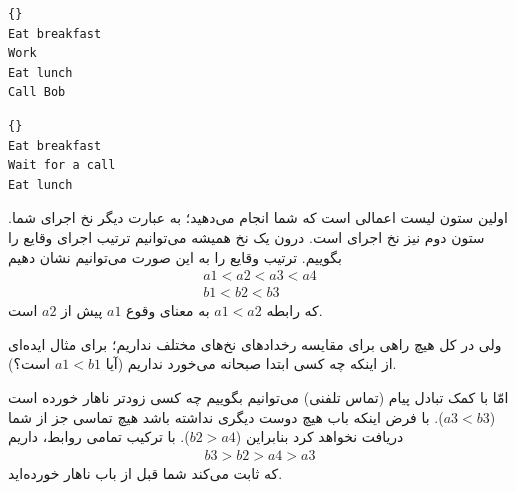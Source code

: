 \documentclass{book}
\begin{document}
%
\begin{latin}
\begin{minipage}[t]{2in}
\begin{latin}
\begin{lstlisting}[title=\rl{نخ \lr{A} (شما)}]{}
Eat breakfast 
Work          
Eat lunch     
Call Bob
\end{lstlisting}
\end{latin}
\end{minipage}
\hfill
\begin{minipage}[t]{2in}
\begin{latin}
\begin{lstlisting}[title=\rl{نخ \lr{B} (‌Bob)}]{}
Eat breakfast
Wait for a call
Eat lunch
\end{lstlisting}
\end{latin}
\end{minipage}
\end{latin}
%
    اولین ستون لیست اعمالی است که شما انجام می‌دهید؛ به عبارت دیگر نخ اجرای شما. 
    ستون دوم نیز نخ اجرای  است. درون یک نخ همیشه می‌توانیم ترتیب اجرای وقایع را بگوییم. 
    ترتیب وقایع را به این صورت می‌توانیم نشان دهیم
%
\begin{eqnarray*}
a1 < a2 < a3 < a4  \\
b1 < b2 < b3
\end{eqnarray*}
%
    که رابطه  $a1 < a2$ به معنای وقوع  $a1$ پیش از  $a2$ است. 

    ولی در کل هیچ راهی برای مقایسه رخدادهای نخ‌های مختلف نداریم؛ برای مثال ایده‌ای از اینکه چه کسی ابتدا صبحانه می‌خورد نداریم 
    (آیا $a1 < b1$  است؟).
    
    امّا با کمک تبادل پیام (تماس تلفنی) می‌توانیم بگوییم چه کسی زودتر ناهار خورده است ($a3 < b3$).
    با فرض اینکه باب هیچ دوست دیگری نداشته باشد هیچ تماسی جز از شما دریافت نخواهد کرد بنابراین  ($b2 > a4$).
    با ترکیب تمامی روابط، داریم 
%
\begin{eqnarray*}
b3 > b2 > a4 > a3
\end{eqnarray*}
%
    که ثابت می‌کند شما قبل از باب ناهار خورده‌اید. 
\end{document}
